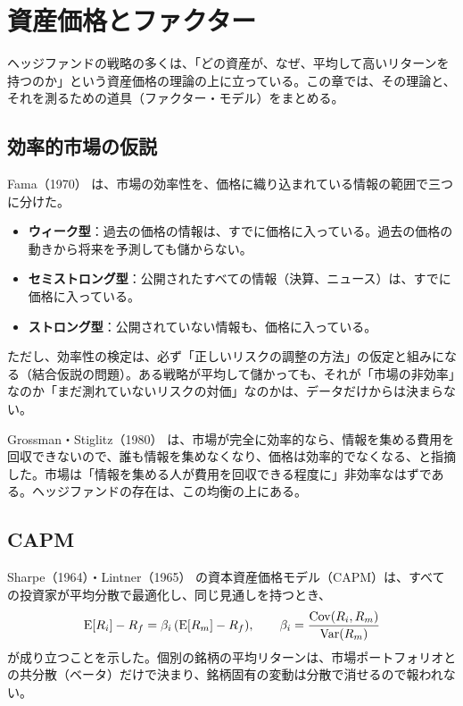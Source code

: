 \chapter{資産価格とファクター}
\label{ch:factor}

ヘッジファンドの戦略の多くは、「どの資産が、なぜ、平均して高いリターンを持つのか」という資産価格の理論の上に立っている。この章では、その理論と、それを測るための道具（ファクター・モデル）をまとめる。

\section{効率的市場の仮説}

Fama（1970）\cite{fama1970} は、市場の効率性を、価格に織り込まれている情報の範囲で三つに分けた。

\begin{itemize}
\item \textbf{ウィーク型}：過去の価格の情報は、すでに価格に入っている。過去の価格の動きから将来を予測しても儲からない。
\item \textbf{セミストロング型}：公開されたすべての情報（決算、ニュース）は、すでに価格に入っている。
\item \textbf{ストロング型}：公開されていない情報も、価格に入っている。
\end{itemize}

ただし、効率性の検定は、必ず「正しいリスクの調整の方法」の仮定と組みになる（結合仮説の問題）。ある戦略が平均して儲かっても、それが「市場の非効率」なのか「まだ測れていないリスクの対価」なのかは、データだけからは決まらない。

Grossman・Stiglitz（1980）\cite{grossman1980} は、市場が完全に効率的なら、情報を集める費用を回収できないので、誰も情報を集めなくなり、価格は効率的でなくなる、と指摘した。市場は「情報を集める人が費用を回収できる程度に」非効率なはずである。ヘッジファンドの存在は、この均衡の上にある。

\section{CAPM}

Sharpe（1964）\cite{sharpe1964}・Lintner（1965）\cite{lintner1965} の資本資産価格モデル（CAPM）は、すべての投資家が平均分散で最適化し、同じ見通しを持つとき、
\begin{equation}
\mathrm{E}[R_i] - R_f = \beta_i\,(\mathrm{E}[R_m] - R_f), \qquad \beta_i = \frac{\mathrm{Cov}(R_i, R_m)}{\mathrm{Var}(R_m)}
\end{equation}
が成り立つことを示した。個別の銘柄の平均リターンは、市場ポートフォリオとの共分散（ベータ）だけで決まり、銘柄固有の変動は分散で消せるので報われない。

